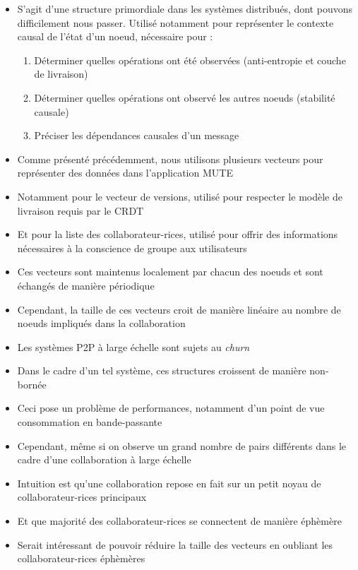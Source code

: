 \begin{itemize}
    \item S'agit d'une structure primordiale dans les systèmes distribués, dont pouvons difficilement nous passer.
      Utilisé notamment pour représenter le contexte causal de l'état d'un noeud, nécessaire pour :
      \begin{enumerate}
        \item Déterminer quelles opérations ont été observées (anti-entropie et couche de livraison)
        \item Déterminer quelles opérations ont observé les autres noeuds (stabilité causale)
        \item Préciser les dépendances causales d'un message
      \end{enumerate}
    \item Comme présenté précédemment, nous utilisons plusieurs vecteurs pour représenter des données dans l'application MUTE
    \item Notamment pour le vecteur de versions, utilisé pour respecter le modèle de livraison requis par le \ac{CRDT}
    \item Et pour la liste des collaborateur-rices, utilisé pour offrir des informations nécessaires à la conscience de groupe aux utilisateurs
    \item Ces vecteurs sont maintenus localement par chacun des noeuds et sont échangés de manière périodique
    \item Cependant, la taille de ces vecteurs croit de manière linéaire au nombre de noeuds impliqués dans la collaboration
    \item Les systèmes \ac{P2P} à large échelle sont sujets au \emph{churn}
    \item Dans le cadre d'un tel système, ces structures croissent de manière non-bornée
    \item Ceci pose un problème de performances, notamment d'un point de vue consommation en bande-passante
    \item Cependant, même si on observe un grand nombre de pairs différents dans le cadre d'une collaboration à large échelle
    \item Intuition est qu'une collaboration repose en fait sur un petit noyau de collaborateur-rices principaux
    \item Et que majorité des collaborateur-rices se connectent de manière éphèmère
    \item Serait intéressant de pouvoir réduire la taille des vecteurs en oubliant les collaborateur-rices éphèmères

\end{itemize}
